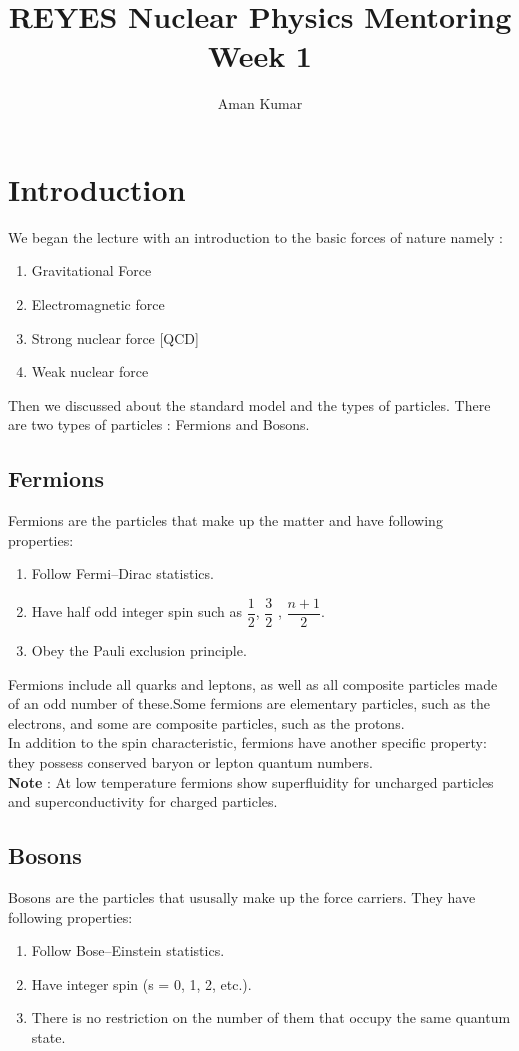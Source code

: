 \documentclass[a4paper]{article}
\title{REYES Nuclear Physics Mentoring Week 1}
\author{Aman Kumar}
\begin{document}
\maketitle

\section{Introduction}
We began the lecture with an introduction to the basic forces of nature namely : \\
\begin{enumerate}
    \item Gravitational Force
    \item Electromagnetic force 
    \item Strong nuclear force [QCD]
    \item Weak nuclear force
\end{enumerate}

Then we discussed about the standard model and the types of particles. There are two types of particles : Fermions and Bosons. 

\subsection{Fermions}
Fermions are the particles that make up the matter and have following properties: 
\begin{enumerate}
    \item Follow Fermi–Dirac statistics.
    \item Have half odd integer spin such as $\dfrac{1}{2}$, $\dfrac{3}{2}$ , $\dfrac{n + 1}{2}$.
    \item  Obey the Pauli exclusion principle.
\end{enumerate} 

Fermions include all quarks and leptons, as well as all composite particles made of an odd number of these.Some fermions are elementary particles, such as the electrons, and some are composite particles, such as the protons.\\

In addition to the spin characteristic, fermions have another specific property: they possess conserved baryon or lepton quantum numbers.\\

\textbf{Note} :  At low temperature fermions show superfluidity for uncharged particles and superconductivity for charged particles. 

\subsection{Bosons}
Bosons are the particles that ususally make up the force carriers. They have following properties:
\begin{enumerate}
    \item Follow Bose–Einstein statistics.
    \item Have integer spin (s = 0, 1, 2, etc.).
    \item  There is no restriction on the number of them that occupy the same quantum state.
\end{enumerate} 
\end{document}
